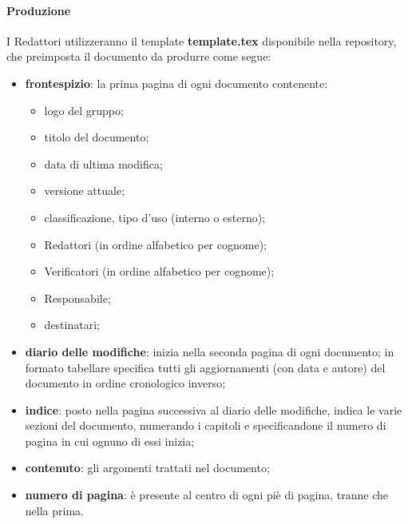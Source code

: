 		\paragraph{Produzione}
		I Redattori utilizzeranno il template \textbf{template.tex} disponibile nella repository, che preimposta il documento da produrre come segue:
		\begin{itemize}
			\item \textbf{frontespizio}: la prima pagina di ogni documento contenente:
			\begin{itemize}
				\item logo del gruppo;
				\item titolo del documento;
				\item data di ultima modifica;
				\item versione attuale;
				\item classificazione, tipo d'uso (interno o esterno);
				\item Redattori (in ordine alfabetico per cognome);
				\item Verificatori (in ordine alfabetico per cognome);
				\item Responsabile;
				\item destinatari;
			\end{itemize}
			\item \textbf{diario delle modifiche}: inizia nella seconda pagina di ogni documento; in formato tabellare specifica tutti gli aggiornamenti (con data e autore) del documento in ordine cronologico inverso;
			\item \textbf{indice}: posto nella pagina successiva al diario delle modifiche, indica le varie sezioni del documento, numerando i capitoli e specificandone il numero di pagina in cui ognuno di essi inizia;
			\item \textbf{contenuto}: gli argomenti trattati nel documento;
			\item \textbf{numero di pagina}: è presente al centro di ogni piè di pagina, tranne che nella prima.
		\end{itemize}

